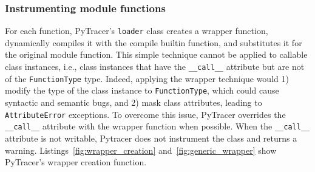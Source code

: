 \documentclass[11pt]{article}
\newcommand{\tristan}[1]{\color{orange}\textbf{From Tristan:} #1\color{black}\xspace}
\newcommand{\Yohan}[1]{\color{green!75!black}\textbf{Yohan:} #1\color{black}\xspace}
\newcommand{\pytracer}[0]{PyTracer\xspace}
\begin{document}
\subsubsection{Instrumenting module functions}

For each function, \pytracer's \texttt{loader} class creates a wrapper function, dynamically compiles it with the compile builtin function, and substitutes it for the original module function. This simple technique
cannot be applied to callable class instances, i.e., class instances that have the \texttt{\_\_call\_\_} attribute but are not of the \texttt{FunctionType} type. Indeed, applying the wrapper technique would 1) modify the type of the class instance to \texttt{FunctionType}, which could cause syntactic and semantic bugs, and 2) mask class attributes, leading to \texttt{AttributeError} exceptions.
To overcome this issue, \pytracer overrides the \texttt{\_\_call\_\_} attribute with the wrapper function when possible. When the \texttt{\_\_call\_\_} attribute is not writable,  Pytracer does not instrument the class and returns a warning. 
Listings~\ref{fig:wrapper_creation} and~\ref{fig:generic_wrapper} show \pytracer's wrapper creation function.



\end{document}
